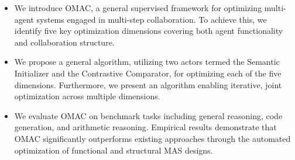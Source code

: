\begin{itemize}[leftmargin=*]
    \item We introduce OMAC, a general supervised framework for optimizing multi-agent systems engaged in multi-step collaboration. To achieve this, we identify five key optimization dimensions covering both agent functionality and collaboration structure.

    \item We propose a general algorithm, utilizing two actors termed the Semantic Initializer and the Contrastive Comparator, for optimizing each of the five dimensions. Furthermore, we present an algorithm enabling iterative, joint optimization across multiple dimensions.


    \item We evaluate OMAC on benchmark tasks including general reasoning, code generation, and arithmetic reasoning. Empirical results demonstrate that OMAC significantly outperforms existing approaches through the automated optimization of functional and structural MAS designs.

\end{itemize}



\endinput


Our contributions can be summarized as follows:

